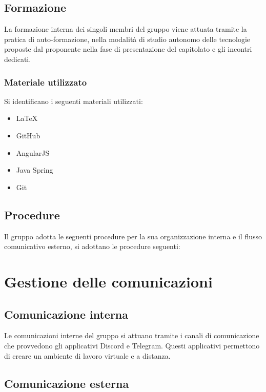 \subsection{Formazione}

La formazione interna dei singoli membri del gruppo viene attuata tramite la pratica di auto-formazione, nella modalità di studio autonomo delle tecnologie proposte dal proponente nella fase di presentazione del capitolato e gli incontri dedicati.

\subsubsection{Materiale utilizzato}

Si identificano i seguenti materiali utilizzati:

\begin{itemize}
\item LaTeX
\item GitHub
\item AngularJS
\item Java Spring
\item Git
\end{itemize}

\subsection{Procedure}

Il gruppo adotta le seguenti procedure per la sua organizzazione interna e il flusso comunicativo esterno, si adottano le procedure seguenti:

\section{Gestione delle comunicazioni}

\subsection{Comunicazione interna}

Le comunicazioni interne del gruppo si attuano tramite i canali di comunicazione che provvedono gli applicativi Discord e Telegram. Questi applicativi permettono di creare un ambiente di lavoro virtuale e a distanza.

\subsection{Comunicazione esterna}

